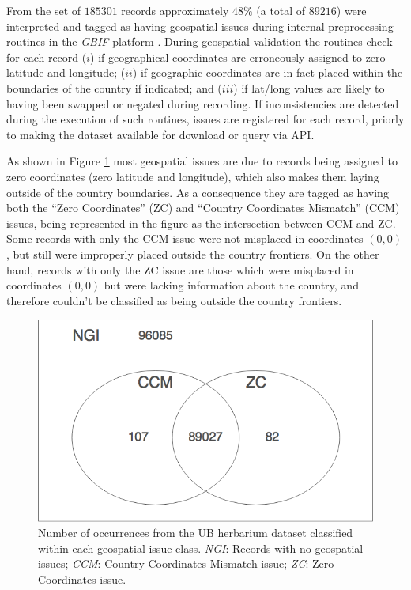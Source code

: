 From the set of $185301$ records approximately $48\%$ (a total of $89216$) were interpreted and tagged as having geospatial issues during internal preprocessing routines in the \textit{GBIF} platform \cite{gbif_dataprocessing}.
During geospatial validation the routines check for each record ($i$) if geographical coordinates are erroneously assigned to zero latitude and longitude; ($ii$) if geographic coordinates are in fact placed within the boundaries of the country if indicated; and ($iii$) if lat/long values are likely to having been swapped or negated during recording.
If inconsistencies are detected during the execution of such routines, issues are registered for each record, priorly to making the dataset available for download or query via API. 

As shown in Figure \ref{fig:venn_geospatial_issues} most geospatial issues are due to records being assigned to zero coordinates (zero latitude and longitude), which also makes them laying outside of the country boundaries. As a consequence they are tagged as having both the ``Zero Coordinates'' (ZC) and ``Country Coordinates Mismatch'' (CCM) issues, being represented in the figure as the intersection between CCM and ZC.
Some records with only the CCM issue were not misplaced in coordinates $(0,0)$, but still were improperly placed outside the country frontiers. 
On the other hand, records with only the ZC issue are those which were misplaced in coordinates $(0,0)$ but were lacking information about the country, and therefore couldn't be classified as being outside the country frontiers.

  \begin{figure}[h!]
  	\centering
    \includegraphics[width=0.6\linewidth]{figures/venn_geospatial_issues.png}
    \caption{Number of occurrences from the UB herbarium dataset classified within each geospatial issue class. \textit{NGI}: Records with no geospatial issues; \textit{CCM}: Country Coordinates Mismatch issue; \textit{ZC}: Zero Coordinates issue.}
    \label{fig:venn_geospatial_issues}
  \end{figure}

